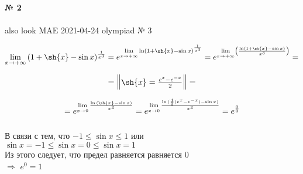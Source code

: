 \documentclass{article}
\begin{document}
\textbf{№ 2} 
\\
\\ also look MAE 2021-04-24 olympiad № 3

\begingroup
\Large

$$ \lim\limits_{x \to +\infty} \left( 1+\sh{x}-\sin{x} \right)^{\frac{1}{x^3}}
= e^{\lim\limits_{x \to +\infty} \ln \left( 1+\sh{x}-\sin{x} \right)^{\frac{1}{x^3}}} 
= e^{\lim\limits_{x \to +\infty} \left( \frac{\ln(1+\sh{x}-\sin{x})}{x^3} \right)} 
= $$

$$ = \begin{Vmatrix} \sh{x} = \frac{e^x-e^{-x}}{2} \end{Vmatrix} 
= $$

$$ = e^{\lim\limits_{x \to 0} \frac{\ln{(\sh{x}-\sin{x})}}{x^3}}
= e^{\lim\limits_{x \to 0}\frac{\ln{(\frac{1}{2}(e^x-e^{-x})-\sin{x})}}{x^3}}
= e^{\frac{0}{0}} $$
\\
В связи с тем, что
$ -1 \leq \sin{x} \leq 1 $ или \\ 
$ \sin{x} = -1 \leq \sin{x} = 0 \leq \sin{x} = 1 $
\\
Из этого следует, что предел равняется равняется 0
\\
$\Rightarrow$ $e^{0} = 1$

\endgroup
\end{document}
